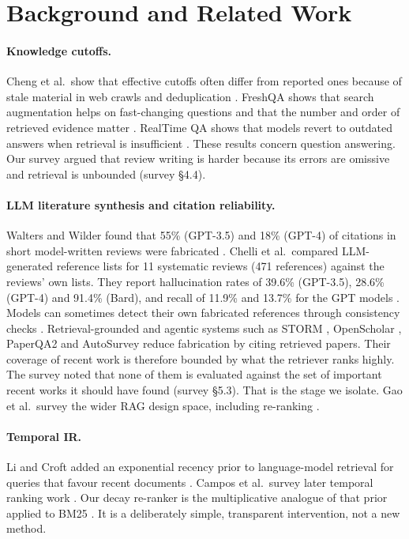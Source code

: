 \documentclass[acmsmall]{acmart}
\begin{document}
\section{Background and Related Work}\label{sec:related}
\paragraph{Knowledge cutoffs.} Cheng et al.\ show that effective cutoffs often differ from reported ones because of stale material in web crawls and deduplication \cite{cheng2024dated}. FreshQA shows that search augmentation helps on fast-changing questions and that the number and order of retrieved evidence matter \cite{vu2023freshllms}. RealTime QA shows that models revert to outdated answers when retrieval is insufficient \cite{kasai2023realtimeqa}. These results concern question answering. Our survey argued that review writing is harder because its errors are omissive and retrieval is unbounded (survey \S4.4).

\paragraph{LLM literature synthesis and citation reliability.} Walters and Wilder found that 55\% (GPT-3.5) and 18\% (GPT-4) of citations in short model-written reviews were fabricated \cite{walters2023fabrication}. Chelli et al.\ compared LLM-generated reference lists for 11 systematic reviews (471 references) against the reviews' own lists. They report hallucination rates of 39.6\% (GPT-3.5), 28.6\% (GPT-4) and 91.4\% (Bard), and recall of 11.9\% and 13.7\% for the GPT models \cite{chelli2024hallucination}. Models can sometimes detect their own fabricated references through consistency checks \cite{agrawal2024references}. Retrieval-grounded and agentic systems such as STORM \cite{shao2024storm}, OpenScholar \cite{asai2026openscholar}, PaperQA2 \cite{skarlinski2024paperqa2} and AutoSurvey \cite{wang2024autosurvey} reduce fabrication by citing retrieved papers. Their coverage of recent work is therefore bounded by what the retriever ranks highly. The survey noted that none of them is evaluated against the set of important recent works it should have found (survey \S5.3). That is the stage we isolate. Gao et al.\ survey the wider RAG design space, including re-ranking \cite{gao2023ragsurvey}.

\paragraph{Temporal IR.} Li and Croft added an exponential recency prior to language-model retrieval for queries that favour recent documents \cite{li2003timebased}. Campos et al.\ survey later temporal ranking work \cite{campos2014survey}. Our decay re-ranker is the multiplicative analogue of that prior applied to BM25 \cite{robertson2009bm25}. It is a deliberately simple, transparent intervention, not a new method.
\end{document}
